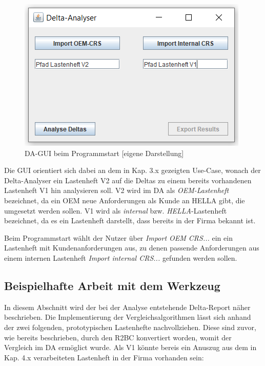 \documentclass[12pt]{report}
\begin{document}
\begin{figure}[h!]
\begin{center}
\includegraphics[scale=1]{Bilder/DA-GUI-leer.png}
\caption{DA-GUI beim Programmstart [eigene Darstellung]}
\end{center}
\end{figure}

Die GUI orientiert sich dabei an dem in Kap. 3.x gezeigten Use-Case, wonach der Delta-Analyser ein Lastenheft V2 auf die Deltas zu einem bereits vorhandenen Lastenheft V1 hin analysieren soll. V2 wird im DA als \textit{OEM-Lastenheft} bezeichnet, da ein OEM neue Anforderungen als Kunde an HELLA gibt, die umgesetzt werden sollen. V1 wird als \textit{internal} bzw. \textit{HELLA}-Lastenheft bezeichnet, da es ein Lastenheft darstellt, dass bereits in der Firma bekannt ist.

Beim Programmstart wählt der Nutzer über \textit{Import OEM CRS...} ein ein Lastenheft mit Kundenanforderungen aus, zu denen passende Anforderungen aus einem internen Lastenheft \textit{Import internal CRS... }gefunden werden sollen. 

\subsection{Beispielhafte Arbeit mit dem Werkzeug}
In diesem Abschnitt wird der bei der Analyse entstehende Delta-Report näher beschrieben. Die Implementierung der Vergleichsalgorithmen lässt sich anhand der zwei folgenden, prototypischen Lastenhefte nachvollziehen. Diese sind zuvor, wie bereits beschrieben, durch den R2BC konvertiert worden, womit der Vergleich im DA ermöglict wurde. Als V1 könnte bereis ein Anuszug aus dem in Kap. 4.x verarbeiteten Lastenheft in der Firma vorhanden sein:\\
\end{document}

